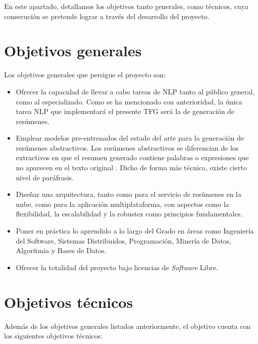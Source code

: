 
En este apartado, detallamos los objetivos tanto generales, como técnicos, cuya consecución se pretende lograr a través del desarrollo del proyecto.

\section{Objetivos generales}

Los objetivos generales que persigue el proyecto son:

\begin{itemize}
	\item [\textbullet] Ofrecer la capacidad de llevar a cabo tareas de NLP tanto al público general, como al especializado. Como se ha mencionado con anterioridad, la única tarea NLP que implementará el presente TFG será la de generación de resúmenes.
	
	\item [\textbullet] Emplear modelos pre-entrenados del estado del arte para la generación de resúmenes abstractivos. Los resúmenes abstractivos se diferencian de los extractivos en que el resumen generado contiene palabras o expresiones que no aparecen en el texto original \cite{abigail17}. Dicho de forma más técnica, existe cierto nivel de paráfrasis.
	
	\item [\textbullet] Diseñar una arquitectura, tanto como para el servicio de resúmenes en la nube, como para la aplicación multiplataforma, con aspectos como la flexibilidad, la escalabilidad y la robustez como principios fundamentales.
	
	\item [\textbullet] Poner en práctica lo aprendido a lo largo del Grado en áreas como Ingeniería del Software, Sistemas Distribuidos, Programación, Minería de Datos, Algoritmia y Bases de Datos.
	
	\item [\textbullet] Ofrecer la totalidad del proyecto bajo licencias de \emph{Software} Libre.
\end{itemize}

\bigskip

\section{Objetivos técnicos}

Además de los objetivos generales listados anteriormente, el objetivo cuenta con los siguientes objetivos técnicos:

